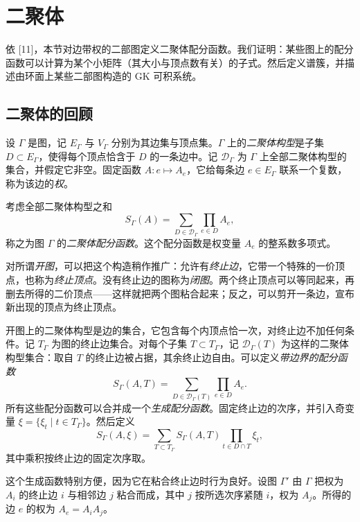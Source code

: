 \section{二聚体}

依 [11]，本节对边带权的二部图定义二聚体配分函数。我们证明：某些图上的配分函数可以计算为某个小矩阵（其大小与顶点数有关）的子式。然后定义谱簇，并描述由环面上某些二部图构造的 GK 可积系统。

\subsection{二聚体的回顾}

设 $\Gamma$ 是图，记 $E_\Gamma$ 与 $V_\Gamma$ 分别为其边集与顶点集。$\Gamma$ 上的\emph{二聚体构型}是子集 $D\subset E_\Gamma$，使得每个顶点恰含于 $D$ 的一条边中。记 $\mathcal{D}_\Gamma$ 为 $\Gamma$ 上全部二聚体构型的集合，并假定它非空。固定函数 $A: e\mapsto A_e$，它给每条边 $e\in E_\Gamma$ 联系一个复数，称为该边的\emph{权}。

考虑全部二聚体构型之和
\begin{equation}\label{eq:1.25}
S_\Gamma(A)=\sum_{D\in\mathcal{D}_\Gamma}\prod_{e\in D}A_e,
\tag{1.25}
\end{equation}
称之为图 $\Gamma$ 的\emph{二聚体配分函数}。这个配分函数是权变量 $A_e$ 的整系数多项式。

对所谓\emph{开图}，可以把这个构造稍作推广：允许有\emph{终止边}，它带一个特殊的一价顶点，也称为\emph{终止顶点}。没有终止边的图称为\emph{闭图}。两个终止顶点可以等同起来，再删去所得的二价顶点——这样就把两个图粘合起来；反之，可以剪开一条边，宣布新出现的顶点为终止顶点。

开图上的二聚体构型是边的集合，它包含每个内顶点恰一次，对终止边不加任何条件。记 $T_\Gamma$ 为图的终止边集合。对每个子集 $T\subset T_\Gamma$，记 $\mathcal{D}_\Gamma(T)$ 为这样的二聚体构型集合：取自 $T$ 的终止边被占据，其余终止边自由。可以定义\emph{带边界的配分函数}
\begin{equation}\label{eq:1.26}
S_\Gamma(A,T)=\sum_{D\in\mathcal{D}_\Gamma(T)}\prod_{e\in D}A_e.
\tag{1.26}
\end{equation}
所有这些配分函数可以合并成一个\emph{生成配分函数}。固定终止边的次序，并引入奇变量 $\xi=\{\xi_t\mid t\in T_\Gamma\}$。然后定义
\[
S_\Gamma(A,\xi)=\sum_{T\subset T_\Gamma}S_\Gamma(A,T)\prod_{t\in D\cap T}\xi_t,
\]
其中乘积按终止边的固定次序取。

这个生成函数特别方便，因为它在粘合终止边时行为良好。设图 $\Gamma'$ 由 $\Gamma$ 把权为 $A_i$ 的终止边 $i$ 与相邻边 $j$ 粘合而成，其中 $j$ 按所选次序紧随 $i$，权为 $A_j$。所得的边 $e$ 的权为 $A_e=A_iA_j$。

